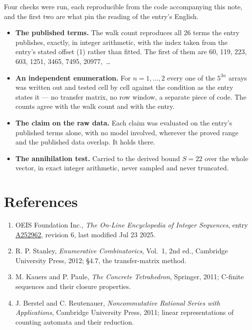 \documentclass[11pt]{article}
\theoremstyle{definition}
\begin{document}
Four checks were run, each reproducible from the code accompanying this note, and the first two are what pin the reading of the entry's English.

\begin{itemize}

\item {\bfseries The published terms.} The walk count reproduces all 26 terms the entry publishes, exactly, in integer arithmetic, with the index taken from the entry's stated offset (1) rather than fitted. The first of them are 60, 119, 223, 603, 1251, 3465, 7495, 20977,~\dots

\item {\bfseries An independent enumeration.} For $n = 1,\dots,2$ every one of the $5^{3n}$ arrays was written out and tested cell by cell against the condition as the entry states it --- no transfer matrix, no row window, a separate piece of code. The counts agree with the walk count and with the entry.

\item {\bfseries The claim on the raw data.} Each claim was evaluated on the entry's published terms alone, with no model involved, wherever the proved range and the published data overlap. It holds there.

\item {\bfseries The annihilation test.} Carried to the derived bound $S = 22$ over the whole vector, in exact integer arithmetic, never sampled and never truncated.

\end{itemize}

\section{References}

\begin{enumerate}

\item OEIS Foundation Inc., \emph{The On-Line Encyclopedia of Integer Sequences}, entry \href{https://oeis.org/A252962}{A252962}, revision 6, last modified Jul 23 2025.

\item R. P. Stanley, \emph{Enumerative Combinatorics}, Vol.~1, 2nd ed., Cambridge University Press, 2012; \S4.7, the transfer-matrix method.

\item M. Kauers and P. Paule, \emph{The Concrete Tetrahedron}, Springer, 2011; C-finite sequences and their closure properties.

\item J. Berstel and C. Reutenauer, \emph{Noncommutative Rational Series with Applications}, Cambridge University Press, 2011; linear representations of counting automata and their reduction.

\end{enumerate}
\end{document}
